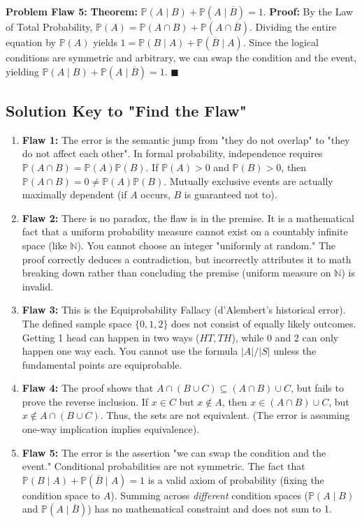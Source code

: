 \documentclass[11pt]{article}
\newcommand{\prob}[1]{\vspace{4mm}\noindent\textbf{Problem #1:}}
\newcommand{\qedsymbolcustom}{$\blacksquare$}
\begin{document}
\prob{Flaw 5} \textbf{Theorem:} $\mathbb{P}(A \mid B) + \mathbb{P}(A \mid \overline{B}) = 1$.
\newline \textbf{Proof:} By the Law of Total Probability, $\mathbb{P}(A) = \mathbb{P}(A \cap B) + \mathbb{P}(A \cap \overline{B})$. Dividing the entire equation by $\mathbb{P}(A)$ yields $1 = \mathbb{P}(B \mid A) + \mathbb{P}(\overline{B} \mid A)$. Since the logical conditions are symmetric and arbitrary, we can swap the condition and the event, yielding $\mathbb{P}(A \mid B) + \mathbb{P}(A \mid \overline{B}) = 1$. \qedsymbolcustom

\vspace{1cm}
\subsection*{Solution Key to "Find the Flaw"}
\begin{enumerate}
    \item \textbf{Flaw 1:} The error is the semantic jump from "they do not overlap" to "they do not affect each other". In formal probability, independence requires $\mathbb{P}(A \cap B) = \mathbb{P}(A)\mathbb{P}(B)$. If $\mathbb{P}(A) > 0$ and $\mathbb{P}(B) > 0$, then $\mathbb{P}(A \cap B) = 0 \neq \mathbb{P}(A)\mathbb{P}(B)$. Mutually exclusive events are actually maximally dependent (if $A$ occurs, $B$ is guaranteed not to).
    \item \textbf{Flaw 2:} There is no paradox, the flaw is in the premise. It is a mathematical fact that a uniform probability measure cannot exist on a countably infinite space (like $\mathbb{N}$). You cannot choose an integer "uniformly at random." The proof correctly deduces a contradiction, but incorrectly attributes it to math breaking down rather than concluding the premise (uniform measure on $\mathbb{N}$) is invalid.
    \item \textbf{Flaw 3:} This is the Equiprobability Fallacy (d'Alembert's historical error). The defined sample space $\{0, 1, 2\}$ does not consist of equally likely outcomes. Getting 1 head can happen in two ways ($HT, TH$), while 0 and 2 can only happen one way each. You cannot use the formula $|A|/|S|$ unless the fundamental points are equiprobable.
    \item \textbf{Flaw 4:} The proof shows that $A \cap (B \cup C) \subseteq (A \cap B) \cup C$, but fails to prove the reverse inclusion. If $x \in C$ but $x \notin A$, then $x \in (A \cap B) \cup C$, but $x \notin A \cap (B \cup C)$. Thus, the sets are not equivalent. (The error is assuming one-way implication implies equivalence).
    \item \textbf{Flaw 5:} The error is the assertion "we can swap the condition and the event." Conditional probabilities are not symmetric. The fact that $\mathbb{P}(B \mid A) + \mathbb{P}(\overline{B} \mid A) = 1$ is a valid axiom of probability (fixing the condition space to $A$). Summing across \textit{different} condition spaces ($\mathbb{P}(A \mid B)$ and $\mathbb{P}(A \mid \overline{B})$) has no mathematical constraint and does not sum to 1.
\end{enumerate}
\end{document}
